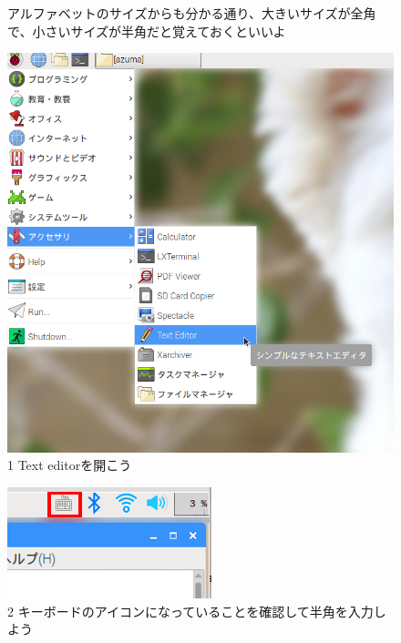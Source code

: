\documentclass[a4paper,12pt]{jarticle}
\begin{document}
\begin{figure}[ht]
\begin{minipage}{16.578cm}
    アルファベットのサイズからも分かる通り、大きいサイズが全角で、小さいサイズが半角だと覚えておくといいよ
  \end{minipage}
  \begin{minipage}{\textwidth}
    \begin{minipage}{0.45\textwidth}
      \includegraphics[width=0.65\linewidth]{textbook-img067.png}\\
      1 Text editorを開こう
    \end{minipage}
    \begin{minipage}{2.582cm}
    \end{minipage}
    \begin{minipage}{0.45\textwidth}
      \includegraphics[width=0.75\linewidth]{textbook-img059.png}\\
      2 キーボードのアイコンになっていることを確認して半角を入力しよう
    \end{minipage}
  \end{minipage}


\end{figure}
\end{document}
